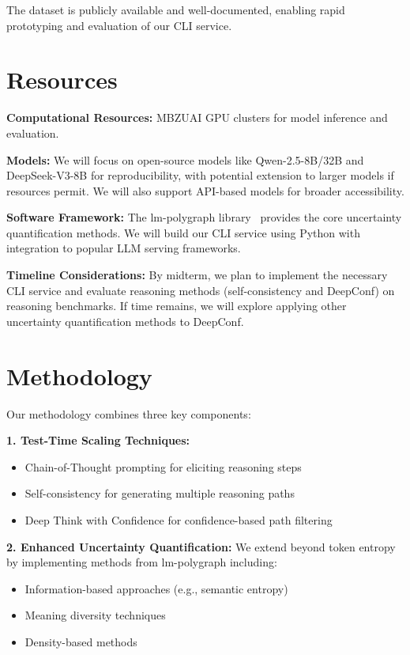 \documentclass[11pt]{article}
\begin{document}
The dataset is publicly available and well-documented, enabling rapid prototyping and evaluation of our CLI service.

\section{Resources}

\textbf{Computational Resources:} MBZUAI GPU clusters for model inference and evaluation.

\textbf{Models:} We will focus on open-source models like Qwen-2.5-8B/32B and DeepSeek-V3-8B for reproducibility, with potential extension to larger models if resources permit. We will also support API-based models for broader accessibility.

\textbf{Software Framework:} The lm-polygraph library~\cite{shelmanov2024benchmarking} provides the core uncertainty quantification methods. We will build our CLI service using Python with integration to popular LLM serving frameworks.

\textbf{Timeline Considerations:} By midterm, we plan to implement the necessary CLI service and evaluate reasoning methods (self-consistency and DeepConf) on reasoning benchmarks. If time remains, we will explore applying other uncertainty quantification methods to DeepConf.

\section{Methodology}

Our methodology combines three key components:

\textbf{1. Test-Time Scaling Techniques:}
\begin{itemize}
\item Chain-of-Thought prompting for eliciting reasoning steps
\item Self-consistency for generating multiple reasoning paths
\item Deep Think with Confidence for confidence-based path filtering
\end{itemize}

\textbf{2. Enhanced Uncertainty Quantification:} We extend beyond token entropy by implementing methods from lm-polygraph including:
\begin{itemize}
\item Information-based approaches (e.g., semantic entropy)
\item Meaning diversity techniques
\item Density-based methods
\end{itemize}
\end{document}
